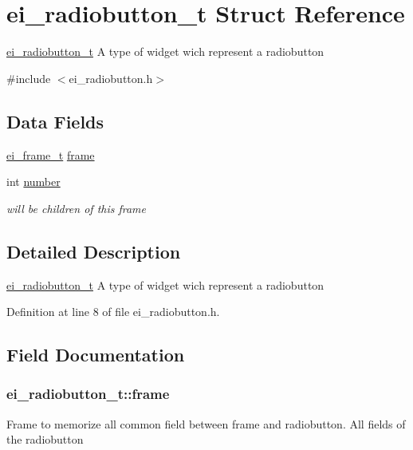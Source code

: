 \hypertarget{structei__radiobutton__t}{\section{ei\+\_\+radiobutton\+\_\+t Struct Reference}
\label{structei__radiobutton__t}
}


\hyperlink{structei__radiobutton__t}{ei\+\_\+radiobutton\+\_\+t} A type of widget wich represent a radiobutton  




{\ttfamily \#include $<$ei\+\_\+radiobutton.\+h$>$}

\subsection*{Data Fields}
\begin{DoxyCompactItemize}
\item 
\hyperlink{structei__frame__t}{ei\+\_\+frame\+\_\+t} \hyperlink{structei__radiobutton__t_a8dc9bfc5f60d7e018fbaa80787f6857f}{frame}
\item 
int \hyperlink{structei__radiobutton__t_a0b39fd134b987b3bfc1a850c4169886d}{number}
\begin{DoxyCompactList}\small\item\em will be children of this frame \end{DoxyCompactList}\end{DoxyCompactItemize}


\subsection{Detailed Description}
\hyperlink{structei__radiobutton__t}{ei\+\_\+radiobutton\+\_\+t} A type of widget wich represent a radiobutton 

Definition at line 8 of file ei\+\_\+radiobutton.\+h.



\subsection{Field Documentation}
\hypertarget{structei__radiobutton__t_a8dc9bfc5f60d7e018fbaa80787f6857f}{
\subsubsection[{frame}]{ ei\+\_\+radiobutton\+\_\+t\+::frame}}\label{structei__radiobutton__t_a8dc9bfc5f60d7e018fbaa80787f6857f}
Frame to memorize all common field between frame and radiobutton. All fields of the radiobutton 

